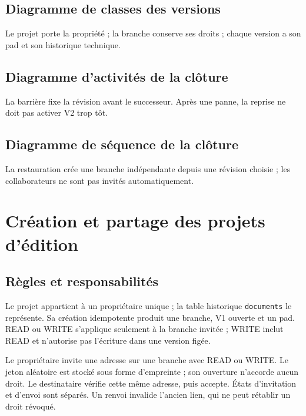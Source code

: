 \subsection{Diagramme de classes des versions}
Le projet porte la propriété ; la branche conserve ses droits ; chaque version a son pad et son historique technique.

\subsection{Diagramme d'activités de la clôture}
La barrière fixe la révision avant le successeur. Après une panne, la reprise ne doit pas activer V2 trop tôt.

\subsection{Diagramme de séquence de la clôture}
La restauration crée une branche indépendante depuis une révision choisie ; les collaborateurs ne sont pas invités automatiquement.

\section{Création et partage des projets d'édition}\label{sec:conception-partage}

\subsection{Règles et responsabilités}
Le projet appartient à un propriétaire unique ; la table historique \texttt{documents} le représente. Sa création idempotente produit une branche, V1 ouverte et un pad. READ ou WRITE s'applique seulement à la branche invitée ; WRITE inclut READ et n'autorise pas l'écriture dans une version figée.

Le propriétaire invite une adresse sur une branche avec READ ou WRITE. Le jeton aléatoire est stocké sous forme d'empreinte ; son ouverture n'accorde aucun droit. Le destinataire vérifie cette même adresse, puis accepte. États d'invitation et d'envoi sont séparés. Un renvoi invalide l'ancien lien, qui ne peut rétablir un droit révoqué.

